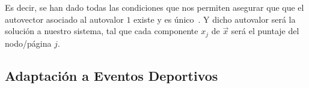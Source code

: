 \par Es decir, se han dado todas las condiciones que nos permiten asegurar que
que el autovector asociado al autovalor $1$ existe y es
\'unico~\cite[p.663-693]{Meyer2000}. Y dicho autovalor ser\'a la soluci\'on a
nuestro sistema, tal que cada componente $x_j$ de $\overrightarrow{x}$ ser\'a el
puntaje del nodo/p\'agina $j$.


\subsection{Adaptaci\'on a Eventos Deportivos}



